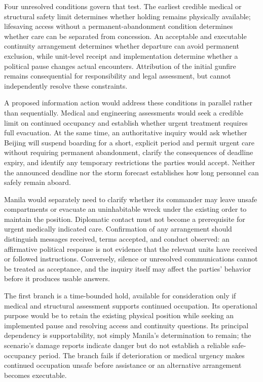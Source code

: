 \documentclass[11pt]{article}
\begin{document}
Four unresolved conditions govern that test. The earliest credible medical or structural safety limit determines whether holding remains physically available; lifesaving access without a permanent-abandonment condition determines whether care can be separated from concession. An acceptable and executable continuity arrangement determines whether departure can avoid permanent exclusion, while unit-level receipt and implementation determine whether a political pause changes actual encounters. Attribution of the initial gunfire remains consequential for responsibility and legal assessment, but cannot independently resolve these constraints.

A proposed information action would address these conditions in parallel rather than sequentially. Medical and engineering assessments would seek a credible limit on continued occupancy and establish whether urgent treatment requires full evacuation. At the same time, an authoritative inquiry would ask whether Beijing will suspend boarding for a short, explicit period and permit urgent care without requiring permanent abandonment, clarify the consequences of deadline expiry, and identify any temporary restrictions the parties would accept. Neither the announced deadline nor the storm forecast establishes how long personnel can safely remain aboard.

Manila would separately need to clarify whether its commander may leave unsafe compartments or evacuate an uninhabitable wreck under the existing order to maintain the position. Diplomatic contact must not become a prerequisite for urgent medically indicated care. Confirmation of any arrangement should distinguish messages received, terms accepted, and conduct observed: an affirmative political response is not evidence that the relevant units have received or followed instructions. Conversely, silence or unresolved communications cannot be treated as acceptance, and the inquiry itself may affect the parties’ behavior before it produces usable answers.

The first branch is a time-bounded hold, available for consideration only if medical and structural assessment supports continued occupation. Its operational purpose would be to retain the existing physical position while seeking an implemented pause and resolving access and continuity questions. Its principal dependency is supportability, not simply Manila’s determination to remain; the scenario’s damage reports indicate danger but do not establish a reliable safe-occupancy period. The branch fails if deterioration or medical urgency makes continued occupation unsafe before assistance or an alternative arrangement becomes executable.
\end{document}

